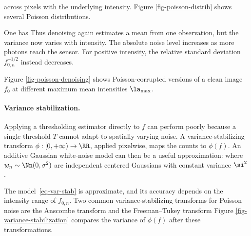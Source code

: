  across pixels with the underlying intensity. Figure \ref{fig-poisson-distrib} shows several Poisson distributions.


One has 
Thus denoising again estimates a mean from one observation, but the variance now varies with intensity. The absolute noise level increases as more photons reach the sensor. For positive intensity, the relative standard deviation $f_{0,n}^{-1/2}$ instead decreases.

Figure \ref{fig-poisson-denoising} shows Poisson-corrupted versions of a clean image $f_0$ at different maximum mean intensities $\la_{\max}$.


  
\paragraph{Variance stabilization.}

Applying a thresholding estimator
directly to $f$ can perform poorly because a single threshold $T$ cannot adapt to spatially varying noise. A variance-stabilizing transform $\phi : [0,+\infty) \rightarrow \RR$, applied pixelwise, maps the counts to $\phi(f)$. An additive Gaussian white-noise model can then be a useful approximation:
where $w_n\sim\Nn(0,\sigma^2)$ are independent centered Gaussians with constant variance $\si^2$.

The model~\eqref{eq-var-stab} is approximate, and its accuracy depends on the intensity range of $f_{0,n}$.
Two common variance-stabilizing transforms for Poisson noise are the Anscombe transform
and the Freeman--Tukey transform
Figure \ref{fig-variance-stabilization} compares the variance of $\phi(f)$ after these transformations.

